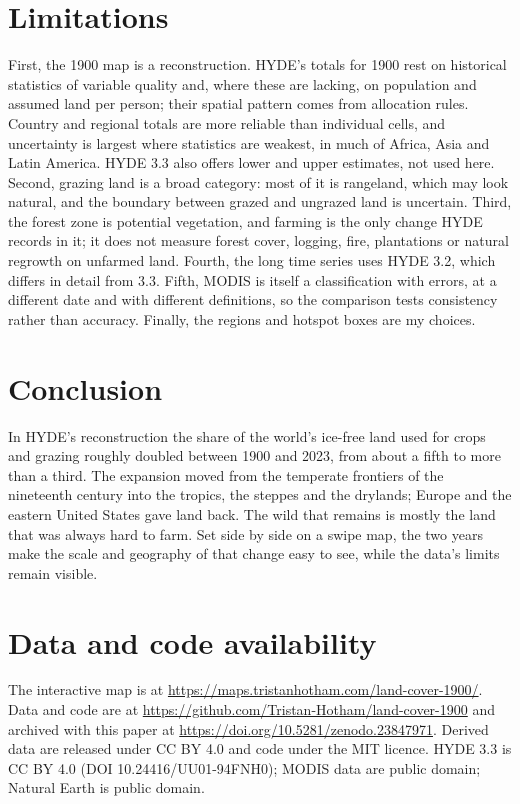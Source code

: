 \documentclass[11pt,a4paper]{article}
\begin{document}
\section{Limitations}\label{sec:limits}
First, the 1900 map is a reconstruction. HYDE's totals for 1900 rest on historical statistics of variable quality and, where these are lacking, on population and assumed land per person; their spatial pattern comes from allocation rules. Country and regional totals are more reliable than individual cells, and uncertainty is largest where statistics are weakest, in much of Africa, Asia and Latin America. HYDE 3.3 also offers lower and upper estimates, not used here. Second, grazing land is a broad category: most of it is rangeland, which may look natural, and the boundary between grazed and ungrazed land is uncertain. Third, the forest zone is potential vegetation, and farming is the only change HYDE records in it; it does not measure forest cover, logging, fire, plantations or natural regrowth on unfarmed land. Fourth, the long time series uses HYDE 3.2, which differs in detail from 3.3. Fifth, MODIS is itself a classification with errors, at a different date and with different definitions, so the comparison tests consistency rather than accuracy. Finally, the regions and hotspot boxes are my choices.

\section{Conclusion}
In HYDE's reconstruction the share of the world's ice-free land used for crops and grazing roughly doubled between 1900 and 2023, from about a fifth to more than a third. The expansion moved from the temperate frontiers of the nineteenth century into the tropics, the steppes and the drylands; Europe and the eastern United States gave land back. The wild that remains is mostly the land that was always hard to farm. Set side by side on a swipe map, the two years make the scale and geography of that change easy to see, while the data's limits remain visible.

\section*{Data and code availability}
The interactive map is at \url{https://maps.tristanhotham.com/land-cover-1900/}. Data and code are at \url{https://github.com/Tristan-Hotham/land-cover-1900} and archived with this paper at \url{https://doi.org/10.5281/zenodo.23847971}. Derived data are released under CC BY 4.0 and code under the MIT licence. HYDE 3.3 is CC BY 4.0 (DOI 10.24416/UU01-94FNH0); MODIS data are public domain; Natural Earth is public domain.
\end{document}
